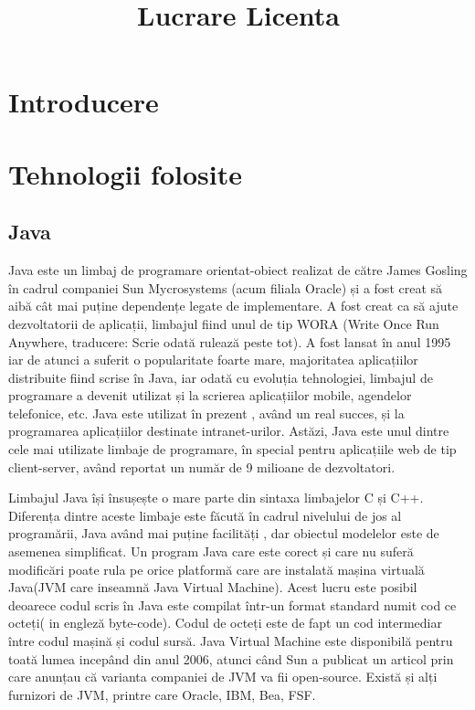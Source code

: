 \documentclass[12pt]{book}
\begin{document}
	
\title{Lucrare Licenta}
\maketitle
	
\section{Introducere}
\section{Tehnologii folosite}
\subsection{Java}
	
Java este un limbaj de programare orientat-obiect realizat de către James Gosling în cadrul companiei Sun Mycrosystems (acum filiala Oracle) și a fost creat să aibă cât mai puține dependențe legate de implementare. A fost creat ca să ajute dezvoltatorii de aplicații, limbajul fiind unul de tip WORA (Write Once Run Anywhere, traducere: Scrie odată rulează peste tot).  A fost lansat în anul 1995 iar de atunci a suferit o popularitate foarte mare, majoritatea aplicațiilor distribuite fiind scrise în Java, iar odată cu evoluția tehnologiei, limbajul de programare a devenit utilizat și la scrierea aplicațiilor mobile, agendelor telefonice, etc. Java este utilizat în prezent , având un real succes, și la programarea aplicațiilor destinate intranet-urilor. Astăzi, Java este unul dintre cele mai utilizate limbaje de programare, în special pentru aplicațiile web de tip client-server, având reportat un număr de 9 milioane de dezvoltatori.
	
Limbajul Java își însușește o mare parte din sintaxa limbajelor C și C++. Diferența dintre aceste limbaje este făcută în cadrul nivelului de jos al programării, Java având mai puține facilități , dar obiectul modelelor este de asemenea simplificat. Un program Java care este corect și care nu suferă modificări poate rula pe orice platformă care are instalată mașina virtuală Java(JVM care inseamnă Java Virtual Machine). Acest lucru este posibil deoarece codul scris în Java este compilat într-un format standard numit cod ce octeți( in engleză byte-code). Codul de octeți este de fapt un cod intermediar între codul mașină și codul sursă. Java Virtual Machine este disponibilă pentru toată lumea incepând din anul 2006, atunci când Sun a publicat un articol prin care anunțau că varianta companiei de JVM va fii open-source. Există și alți furnizori de JVM, printre care Oracle, IBM, Bea, FSF.
	
\end{document}
